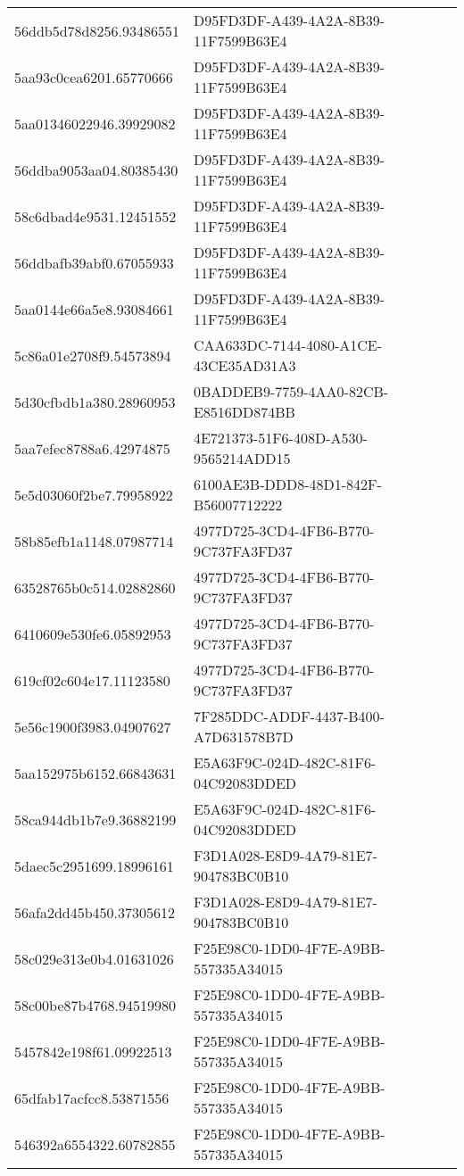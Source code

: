 \begin{tabular}{ll}
56ddb5d78d8256.93486551 & D95FD3DF-A439-4A2A-8B39-11F7599B63E4 \\
5aa93c0cea6201.65770666 & D95FD3DF-A439-4A2A-8B39-11F7599B63E4 \\
5aa01346022946.39929082 & D95FD3DF-A439-4A2A-8B39-11F7599B63E4 \\
56ddba9053aa04.80385430 & D95FD3DF-A439-4A2A-8B39-11F7599B63E4 \\
58c6dbad4e9531.12451552 & D95FD3DF-A439-4A2A-8B39-11F7599B63E4 \\
56ddbafb39abf0.67055933 & D95FD3DF-A439-4A2A-8B39-11F7599B63E4 \\
5aa0144e66a5e8.93084661 & D95FD3DF-A439-4A2A-8B39-11F7599B63E4 \\
5c86a01e2708f9.54573894 & CAA633DC-7144-4080-A1CE-43CE35AD31A3 \\
5d30cfbdb1a380.28960953 & 0BADDEB9-7759-4AA0-82CB-E8516DD874BB \\
5aa7efec8788a6.42974875 & 4E721373-51F6-408D-A530-9565214ADD15 \\
5e5d03060f2be7.79958922 & 6100AE3B-DDD8-48D1-842F-B56007712222 \\
58b85efb1a1148.07987714 & 4977D725-3CD4-4FB6-B770-9C737FA3FD37 \\
63528765b0c514.02882860 & 4977D725-3CD4-4FB6-B770-9C737FA3FD37 \\
6410609e530fe6.05892953 & 4977D725-3CD4-4FB6-B770-9C737FA3FD37 \\
619cf02c604e17.11123580 & 4977D725-3CD4-4FB6-B770-9C737FA3FD37 \\
5e56c1900f3983.04907627 & 7F285DDC-ADDF-4437-B400-A7D631578B7D \\
5aa152975b6152.66843631 & E5A63F9C-024D-482C-81F6-04C92083DDED \\
58ca944db1b7e9.36882199 & E5A63F9C-024D-482C-81F6-04C92083DDED \\
5daec5c2951699.18996161 & F3D1A028-E8D9-4A79-81E7-904783BC0B10 \\
56afa2dd45b450.37305612 & F3D1A028-E8D9-4A79-81E7-904783BC0B10 \\
58c029e313e0b4.01631026 & F25E98C0-1DD0-4F7E-A9BB-557335A34015 \\
58c00be87b4768.94519980 & F25E98C0-1DD0-4F7E-A9BB-557335A34015 \\
5457842e198f61.09922513 & F25E98C0-1DD0-4F7E-A9BB-557335A34015 \\
65dfab17acfcc8.53871556 & F25E98C0-1DD0-4F7E-A9BB-557335A34015 \\
546392a6554322.60782855 & F25E98C0-1DD0-4F7E-A9BB-557335A34015 \\

\end{tabular}

